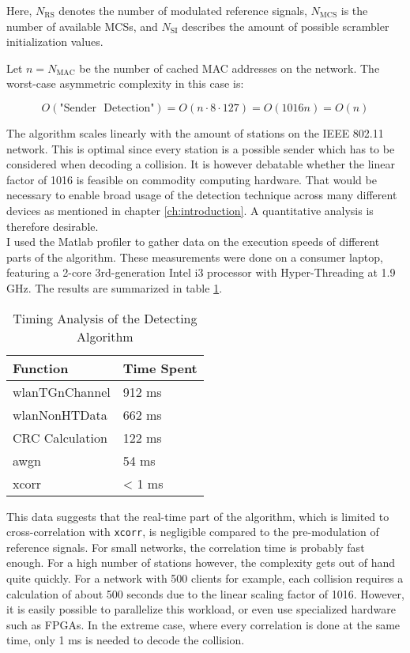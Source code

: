 Here, $ N_{\text{RS}} $ denotes the number of modulated reference signals, $ N_{\text{MCS}} $ is the number of available \glspl{MCS}, and $ N_{\text{SI}} $ describes the amount of possible scrambler initialization values.

Let $ n = N_{\text{MAC}} $ be the number of cached \gls{MAC} addresses on the network. The worst-case asymmetric complexity in this case is:

$$ O(\text{"Sender ~Detection"}) = O(n \cdot 8 \cdot 127) = O(1016 n) = O(n) $$\vspace{0cm}

The algorithm scales linearly with the amount of stations on the IEEE 802.11 network. This is optimal since every station is a possible sender which has to be considered when decoding a collision. It is however debatable whether the linear factor of 1016 is feasible on commodity computing hardware. That would be necessary to enable broad usage of the detection technique across many different devices as mentioned in chapter \ref{ch:introduction}. A quantitative analysis is therefore desirable.\\

I used the Matlab profiler to gather data on the execution speeds of different parts of the algorithm. These measurements were done on a consumer laptop, featuring a 2-core 3rd-generation Intel i3 processor with Hyper-Threading at 1.9 GHz. The results are summarized in table \ref{tbl:timing}.

\begin{table}[ht]
	\centering
	\begin{tabular}{|p{8.5cm}|p{2.5cm}|}
		\hline
		\textbf{Function} & \textbf{Time Spent} \\ \hline
	    wlanTGnChannel & 912 ms \\ \hline
    	wlanNonHTData & 662 ms \\ \hline
	    CRC Calculation & 122 ms \\ \hline
	    awgn & 54 ms \\ \hline
		xcorr & < 1 ms \\ \hline
	\end{tabular}
	\caption{Timing Analysis of the Detecting Algorithm \label{tbl:timing}}
\end{table}

This data suggests that the real-time part of the algorithm, which is limited to cross-correlation with \texttt{xcorr}, is negligible compared to the pre-modulation of reference signals. For small networks, the correlation time is probably fast enough. For a high number of stations however, the complexity gets out of hand quite quickly. For a network with 500 clients for example, each collision requires a calculation of about 500 seconds due to the linear scaling factor of 1016. However, it is easily possible to parallelize this workload, or even use specialized hardware such as \glspl{FPGA}. In the extreme case, where every correlation is done at the same time, only 1 ms is needed to decode the collision.


